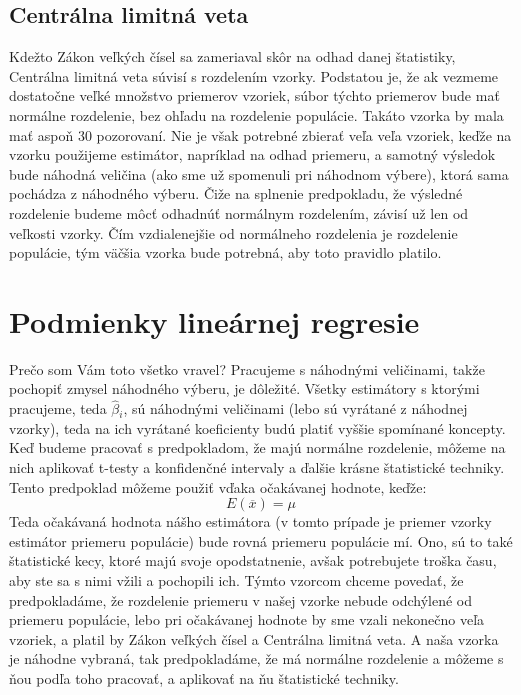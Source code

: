 \hypertarget{centruxe1lna-limitnuxe1-veta}{%
\subsection{Centrálna limitná veta}\label{centruxe1lna-limitnuxe1-veta}}

Kdežto Zákon veľkých čísel sa zameriaval skôr na odhad danej štatistiky,
Centrálna limitná veta súvisí s rozdelením vzorky. Podstatou je, že ak
vezmeme dostatočne veľké množstvo priemerov vzoriek, súbor týchto
priemerov bude mať normálne rozdelenie, bez ohľadu na rozdelenie
populácie. Takáto vzorka by mala mať aspoň 30 pozorovaní. Nie je však
potrebné zbierať veľa veľa vzoriek, keďže na vzorku použijeme estimátor,
napríklad na odhad priemeru, a samotný výsledok bude náhodná veličina
(ako sme už spomenuli pri náhodnom výbere), ktorá sama pochádza z
náhodného výberu. Čiže na splnenie predpokladu, že výsledné rozdelenie
budeme môcť odhadnúť normálnym rozdelením, závisí už len od veľkosti
vzorky. Čím vzdialenejšie od normálneho rozdelenia je rozdelenie
populácie, tým väčšia vzorka bude potrebná, aby toto pravidlo platilo.

\newpage

\hypertarget{podmienky-lineuxe1rnej-regresie}{%
\section{Podmienky lineárnej
regresie}\label{podmienky-lineuxe1rnej-regresie}}

Prečo som Vám toto všetko vravel? Pracujeme s náhodnými veličinami,
takže pochopiť zmysel náhodného výberu, je dôležité. Všetky estimátory s
ktorými pracujeme, teda \(\hat\beta{}_i\), sú náhodnými veličinami (lebo
sú vyrátané z náhodnej vzorky), teda na ich vyrátané koeficienty budú
platiť vyššie spomínané koncepty. Keď budeme pracovať s predpokladom, že
majú normálne rozdelenie, môžeme na nich aplikovať t-testy a konfidenčné
intervaly a ďalšie krásne štatistické techniky. Tento predpoklad môžeme
použiť vďaka očakávanej hodnote, keďže:
\[E(\overline{x}) = \mu\] Teda očakávaná hodnota nášho estimátora (v
tomto prípade je priemer vzorky estimátor priemeru populácie) bude rovná
priemeru populácie mí. Ono, sú to také štatistické kecy, ktoré majú
svoje opodstatnenie, avšak potrebujete troška času, aby ste sa s nimi
vžili a pochopili ich. Týmto vzorcom chceme povedať, že predpokladáme,
že rozdelenie priemeru v našej vzorke nebude odchýlené od priemeru
populácie, lebo pri očakávanej hodnote by sme vzali nekonečno veľa
vzoriek, a platil by Zákon veľkých čísel a Centrálna limitná veta. A
naša vzorka je náhodne vybraná, tak predpokladáme, že má normálne
rozdelenie a môžeme s ňou podľa toho pracovať, a aplikovať na ňu
štatistické techniky.

